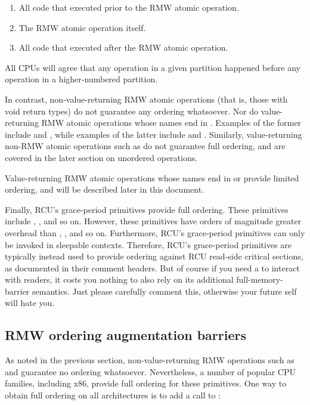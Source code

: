 \begin{enumerate}
 \item	All code that executed prior to the RMW atomic operation.

 \item	The RMW atomic operation itself.

 \item	All code that executed after the RMW atomic operation.
\end{enumerate}

All CPUs will agree that any operation in a given partition happened
before any operation in a higher-numbered partition.

In contrast, non-value-returning RMW atomic operations (that is, those
with void return types) do not guarantee any ordering whatsoever.
Nor do value-returning RMW atomic operations whose names end in .
Examples of the former include  and ,
while examples of the latter include  and
.
Similarly, value-returning non-RMW atomic operations such as
 do not guarantee full ordering, and are covered in
the later section on unordered operations.

Value-returning RMW atomic operations whose names end in  or
 provide limited ordering, and will be described later in this
document.

Finally, RCU's grace-period primitives provide full ordering.
These primitives include , ,
 and so on.
However, these primitives have orders of magnitude greater overhead
than , , and so on.
Furthermore, RCU's grace-period primitives can only be invoked in
sleepable contexts.
Therefore, RCU's grace-period primitives are typically instead used to
provide ordering against RCU read-side critical sections, as documented
in their comment headers.
But of course if you need a  to interact with
readers, it costs you nothing to also rely on its additional
full-memory-barrier semantics.
Just please carefully comment this, otherwise your future self will hate you.


\subsection{RMW ordering augmentation barriers}

As noted in the previous section, non-value-returning RMW operations
such as  and  guarantee no ordering whatsoever.
Nevertheless, a number of popular CPU families, including x86, provide
full ordering for these primitives.
One way to obtain full ordering on all architectures is to add a call
to :

